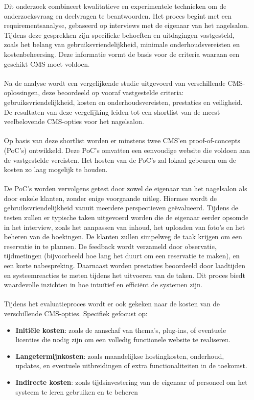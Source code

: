 \noindent
Dit onderzoek combineert kwalitatieve en experimentele technieken om de onderzoeksvraag en deelvragen te beantwoorden. Het proces begint met een requirementsanalyse, gebaseerd op interviews met de eigenaar van het nagelsalon. Tijdens deze gesprekken zijn specifieke behoeften en uitdagingen vastgesteld, zoals het belang van gebruiksvriendelijkheid, minimale onderhoudsvereisten en kostenbeheersing. Deze informatie vormt de basis voor de criteria waaraan een geschikt CMS moet voldoen.
\\ \\
Na de analyse wordt een vergelijkende studie uitgevoerd van verschillende CMS-oplossingen, deze beoordeeld op vooraf vastgestelde criteria: gebruiksvriendelijkheid, kosten en onderhoudsvereisten, prestaties en veiligheid. De resultaten van deze vergelijking leiden tot een shortlist van de meest veelbelovende CMS-opties voor het nagelsalon.
\\ \\
Op basis van deze shortlist worden er minstens twee CMS’en proof-of-concepts (PoC’s) ontwikkeld. Deze PoC's omvatten een eenvoudige website die voldoen aan de vastgestelde vereisten. Het hosten van de PoC's zal lokaal gebeuren om de kosten zo laag mogelijk te houden.
\\ \\
De PoC’s worden vervolgens getest door zowel de eigenaar van het nagelsalon als door enkele klanten, zonder enige voorgaande uitleg. Hiermee wordt de gebruiksvriendelijkheid vanuit meerdere perspectieven geëvalueerd. Tijdens de testen zullen er typische taken uitgevoerd worden die de eigenaar eerder opsomde in het interview, zoals het aanpassen van inhoud, het uploaden van foto’s en het beheren van de boekingen. De klanten zullen simpelweg de taak krijgen om een reservatie in te plannen. De feedback wordt verzameld door observatie, tijdmetingen (bijvoorbeeld hoe lang het duurt om een reservatie te maken), en een korte nabespreking. Daarnaast worden prestaties beoordeeld door laadtijden en systeemreacties te meten tijdens het uitvoeren van de taken. Dit proces biedt waardevolle inzichten in hoe intuïtief en efficiënt de systemen zijn.
\\ \\
Tijdens het evaluatieproces wordt er ook gekeken naar de kosten van de verschillende CMS-opties. Specifiek gefocust op:
\begin{itemize}
    \item \textbf{Initiële kosten}: zoals de aanschaf van thema’s, plug-ins, of eventuele licenties die nodig zijn om een volledig functionele website te realiseren.
    \item \textbf{Langetermijnkosten}: zoals maandelijkse hostingkosten, onderhoud, updates, en eventuele uitbreidingen of extra functionaliteiten in de toekomst.
    \item \textbf{Indirecte kosten}: zoals tijdsinvestering van de eigenaar of personeel om het systeem te leren gebruiken en te beheren
\end{itemize}
